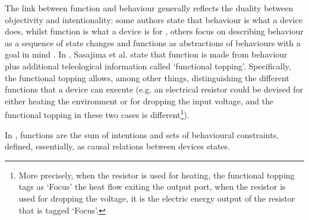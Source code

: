 \documentclass[sw]{iosart2x}
\newcommand{\quotes}[1]{`#1'}
\newcommand{\TODO}[1]{{%
}}
\newcommand{\TODOinline}[1]{{%
}}
\newcommand{\myComment}[1]{{\unskip \ignorespaces}}
\begin{document}
The link between function and behaviour generally reflects the duality between objectivity and intentionality: some authors state that behaviour is what a device does, whilst function is what a device is for \cite{kleer_qualitative_1984}, others focus on describing behaviour as a sequence of state changes and functions as abstractions of behaviours with a goal in mind \cite{umedaFunctionBehaviourStructure1990}.  
In \cite{sasajimaFBRLFunctionBehavior1995, sasajimaInvestigationDomainOntology1994}, Sasajima et al. state that function is made from behaviour plus additional teleological information called \quotes{functional topping}.
Specifically, the functional topping allows, among other things, distinguishing the different functions that a device can execute (e.g. an electrical resistor could be devised for either heating the environment or for dropping the input voltage, and the functional topping in these two cases is different\myComment{a heat exchanger could be devised for either heating or cooling depending on the context, and the functional topping in these two cases is different}\footnote{More precisely, when the resistor is used for heating, the functional topping tags as `Focus' the heat flow exiting the output port, when the resistor is used for dropping the voltage, it is the electric energy output of the resistor that is tagged `Focus'.}).

In \cite{chandrasekaranFunctionDeviceRepresentation2000}, functions are the sum of intentions and sets of behavioural constraints, defined, essentially, as causal relations between devices states.

\end{document}
